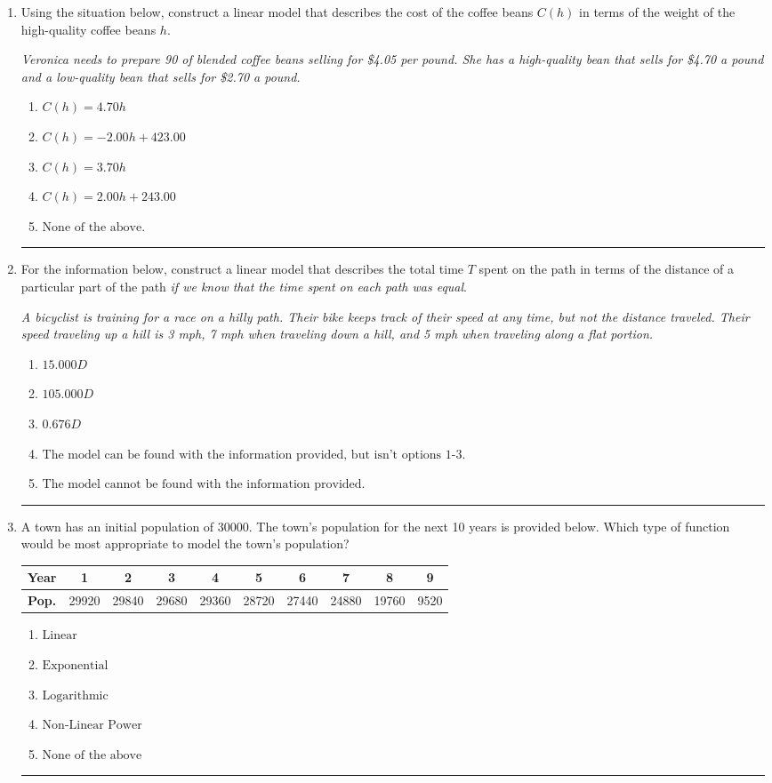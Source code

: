 \documentclass[14pt]{extbook}
\newcommand{\litem}[1]{\item#1\hspace*{-1cm}\rule{\textwidth}{0.4pt}}
\begin{document}
\begin{enumerate}
{\begin{enumerate}[label=\Alph*.]
\end{enumerate} }
\litem{
Using the situation below, construct a linear model that describes the cost of the coffee beans $C(h)$ in terms of the weight of the high-quality coffee beans $h$.
\begin{center}
    \textit{ Veronica needs to prepare 90 of blended coffee beans selling for \$4.05 per pound. She has a high-quality bean that sells for \$4.70 a pound and a low-quality bean that sells for \$2.70 a pound. }
\end{center}
\begin{enumerate}[label=\Alph*.]
\item \( C(h) = 4.70 h \)
\item \( C(h) = -2.00 h + 423.00 \)
\item \( C(h) = 3.70 h \)
\item \( C(h) = 2.00 h + 243.00 \)
\item \( \text{None of the above.} \)

\end{enumerate} }
\litem{
For the information below, construct a linear model that describes the total time $T$ spent on the path in terms of the distance of a particular part of the path \textit{if we know that the time spent on each path was equal}.
\begin{center}
    \textit{ A bicyclist is training for a race on a hilly path. Their bike keeps track of their speed at any time, but not the distance traveled. Their speed traveling up a hill is 3 mph, 7 mph when traveling down a hill, and 5 mph when traveling along a flat portion. }
\end{center}
\begin{enumerate}[label=\Alph*.]
\item \( 15.000 D \)
\item \( 105.000 D \)
\item \( 0.676 D \)
\item \( \text{The model can be found with the information provided, but isn't options 1-3.} \)
\item \( \text{The model cannot be found with the information provided.} \)

\end{enumerate} }
\litem{
A town has an initial population of 30000. The town's population for the next 10 years is provided below. Which type of function would be most appropriate to model the town's population?


\begin{tabular}{c|c|c|c|c|c|c|c|c|c}
\textbf{Year} & 1 & 2 & 3 & 4 & 5 & 6 & 7 & 8 & 9 \tabularnewline
\hline
\textbf{Pop.} & 29920 & 29840 & 29680 & 29360 & 28720 & 27440 & 24880 & 19760 & 9520
\end{tabular} \begin{enumerate}[label=\Alph*.]
\item \( \text{Linear} \)
\item \( \text{Exponential} \)
\item \( \text{Logarithmic} \)
\item \( \text{Non-Linear Power} \)
\item \( \text{None of the above} \)


\end{enumerate}}
\end{enumerate}
\end{document}
